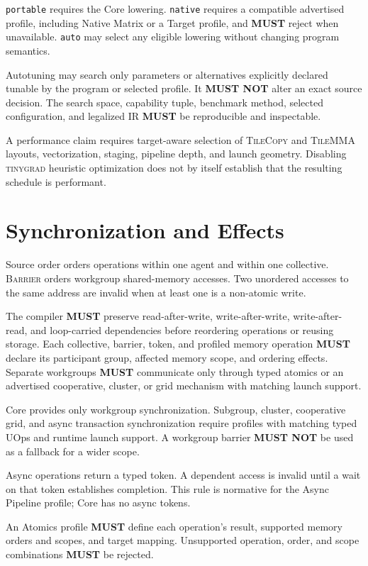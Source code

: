 \documentclass[10pt,letterpaper]{article}
\newcommand{\tinygrad}{\textsc{tinygrad}}
\newcommand{\op}[1]{\textsc{#1}}
\newcommand{\must}{\textbf{MUST}}
\newcommand{\mustnot}{\textbf{MUST NOT}}
\begin{document}
\texttt{portable} requires the Core lowering. \texttt{native} requires a
compatible advertised profile, including Native Matrix or a Target profile,
and \must{} reject when unavailable. \texttt{auto} may select any eligible
lowering without changing program semantics.

Autotuning may search only parameters or alternatives explicitly declared
tunable by the program or selected profile. It \mustnot{} alter an exact source
decision. The search space, capability tuple, benchmark method, selected
configuration, and legalized IR \must{} be reproducible and inspectable.

A performance claim requires target-aware selection of \op{TileCopy} and
\op{TileMMA} layouts, vectorization, staging, pipeline depth, and launch
geometry. Disabling \tinygrad{} heuristic optimization does not by itself
establish that the resulting schedule is performant.

\section*{Synchronization and Effects}

Source order orders operations within one agent and within one collective.
\op{Barrier} orders workgroup shared-memory accesses. Two unordered accesses to
the same address are invalid when at least one is a non-atomic write.

The compiler \must{} preserve read-after-write, write-after-write,
write-after-read, and loop-carried dependencies before reordering operations or
reusing storage. Each collective, barrier, token, and profiled memory operation
\must{} declare its participant group, affected memory scope, and ordering
effects. Separate workgroups \must{} communicate only through typed atomics or
an advertised cooperative, cluster, or grid mechanism with matching launch
support.

Core provides only workgroup synchronization. Subgroup, cluster, cooperative
grid, and async transaction synchronization require profiles with matching
typed UOps and runtime launch support. A workgroup barrier \mustnot{} be used as
a fallback for a wider scope.

Async operations return a typed token. A dependent access is invalid until a
wait on that token establishes completion. This rule is normative for the
Async Pipeline profile; Core has no async tokens.

An Atomics profile \must{} define each operation's result, supported memory
orders and scopes, and target mapping. Unsupported operation, order, and scope
combinations \must{} be rejected.
\end{document}
